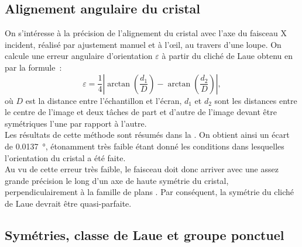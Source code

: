 \subsection{Alignement angulaire du cristal}

On s'intéresse à la précision de l'alignement du cristal avec l'axe du faisceau X incident, réalisé par ajustement manuel et à l'œil, au travers d'une loupe.
On calcule une erreur angulaire d'orientation \(\varepsilon\) à partir du cliché de Laue obtenu en  par la formule~:
\begin{equation}
\varepsilon = \frac{1}{4} \left| \arctan\left( \frac{d_1}{D} \right) - \arctan\left(\frac{d_2}{D}\right) \right|,
\end{equation}
où \(D\) est la distance entre l'échantillon et l'écran, \(d_1\) et \(d_2\) sont les distances entre le centre de l'image et deux tâches de part et d'autre de l'image devant être symétriques l'une par rapport à l'autre.\\
Les résultats de cette méthode sont résumés dans la .
On obtient ainsi un écart de \SI{0.0137}{\degree}, étonamment très faible étant donné les conditions dans lesquelles l'orientation du cristal a été faite.\\
Au vu de cette erreur très faible, le faisceau doit donc arriver avec une assez grande précision le long d'un axe de haute symétrie du cristal, perpendiculairement à la famille de plans . Par conséquent, la symétrie du cliché de Laue devrait être quasi-parfaite.

\begin{table}
\caption{Mesures d'écart par rapport à la symétrie attendue et calcul de l'erreur d'alignement angulaire du cristal par rapport à l'axe de haute symétrie proche.}
\label{tab:LaueAngleError}
\end{table}

\subsection{Symétries, classe de Laue et groupe ponctuel}

